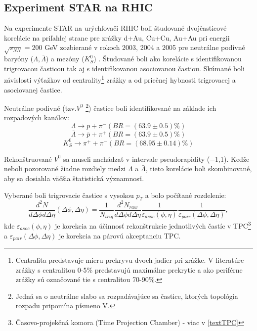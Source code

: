 \documentclass[thesismargins, thesislinespacing]{rnthesis}
\begin{document}
\subsection{Experiment STAR na RHIC}
Na experimente STAR na urýchľovači RHIC boli študované dvojčasticové korelácie na priľahlej strane pre zrážky d+Au, Cu+Cu, Au+Au pri energii $\sqrt{s_{NN}}=$200 GeV zozbierané v rokoch 2003, 2004 a 2005 pre neutrálne podivné baryóny ($\Lambda , \bar{\Lambda}$) a mezóny ($K^0_S$) \cite{clanokstar}. Študované boli ako korelácie s identifikovanou trigrovacou časticou tak aj s identifikovanou asociovanou častiou. Skúmané boli závislosti výťažkov od centrality\footnote{Centralita predstavuje mieru prekryvu dvoch jadier pri zrážke. V literatúre zrážky s centralitou 0-5\% predstavujú maximálne prekrytie a ako periférne zrážky sú označované tie s centralitou 70-90\%.} zrážky a od priečnej hybnosti trigrovacej a asociovanej častice.

Neutrálne podivné (tzv.$V^0$ \footnote{Jedná sa o neutrálne slabo sa rozpadávajúce sa častice, ktorých topológia rozpadu pripomína písmeno V.}) častice boli identifikované na základe ich rozpadových kanálov:
\begin{equation}
\Lambda \rightarrow p + \pi^{-}  (BR=(63.9 \pm 0.5)\%)
\end{equation}
\begin{equation}
\bar{\Lambda} \rightarrow \bar{p} + \pi^{+}  (BR=(63.9 \pm 0.5)\%)
\end{equation}
\begin{equation}
K^0_S \rightarrow \pi^{+} + \pi^{-}  (BR=(68.95 \pm 0.14)\%)
\end{equation}

Rekonštruované $V^0$ sa museli nachádzať v intervale pseudorapidity ($-1$,1). Keďže neboli pozorované žiadne rozdiely medzi $\Lambda$ a $\bar{\Lambda}$, tieto korelácie boli skombinované, aby sa dosiahla väčšia štatistická významnosť.

Vyberané boli trigrovacie častice s vysokou $p_T$ a bolo počítané rozdelenie:
\begin{equation}
\frac{d^2N}{d\Delta \phi d\Delta \eta}(\Delta\phi,\Delta\eta) = \frac{1}{N_{trig}}\frac{d^2N_{raw}}{d\Delta \phi d\Delta \eta}\frac{1}{\varepsilon_{asoc}(\phi,\eta)}\frac{1}{\varepsilon_{pair}(\Delta\phi,\Delta\eta)},
\end{equation}
kde $\varepsilon_{asoc}(\phi,\eta)$ je korekcia na účinnosť rekonštrukcie jednotlivých častíc v TPC\footnote{Časovo-projekčná komora (Time Projection Chamber) - viac v \ref{textTPC}} a $\varepsilon_{pair}(\Delta\phi,\Delta\eta)$ je korekcia na párovú akceptanciu TPC. 
\end{document}
